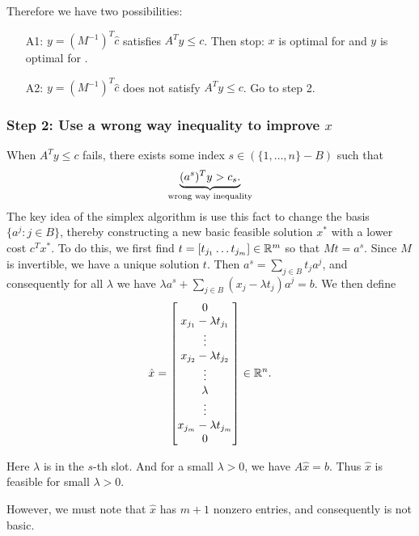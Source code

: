 Therefore we have two possibilities:
\begin{enumerate}
    \item[A1:] $y = (M^{-1})^T \hat{c}$ satisfies $A^T y \le c$.
    Then stop: $x$ is optimal for  and $y$ is optimal for .
    \item[A2:] $y = (M^{-1})^T \hat{c}$ does not satisfy $A^T y \le c$.
    Go to step 2.
\end{enumerate}

\subsubsection{Step 2: Use a wrong way inequality to improve $x$}

When $A^T y \le c$ fails, there exists some index $s \in (\{ 1, \dots, n \} - B)$ such that 
\begin{align}
\underbrace{(a^s)^T y > c_s.}_{\text{wrong way inequality}} \labeq{LP_wrong_way}
\end{align}
The key idea of the simplex algorithm is use this fact to change the basis $\{a^j : j \in B \}$, thereby constructing a new basic feasible solution $x^*$ with a lower cost $c^T x^*$.
To do this, we first find $t = [t_{j_1} \dots t_{j_m}] \in \mathbb{R}^m$ so that $Mt = a^s$.
Since $M$ is invertible, we have a unique solution $t$.
Then $a^s = \sum _{j \in B} t_j a^j$, and consequently for all $\lambda$ we have $\lambda a^s + \sum _{j \in B} (x_j - \lambda t_j) a^j = b$.
We then define
\begin{align}
\hat{x} = \begin{bmatrix}
0 \\
x_{j_1} - \lambda t_{j_1} \\
\vdots \\
x_{j_2} - \lambda t_{j_2} \\
\vdots \\
\lambda \\
\vdots \\
x_{j_m} - \lambda t_{j_m} \\
0 \\
\end{bmatrix}
\in \mathbb{R}^n.
\end{align}

Here $\lambda$ is in the $s$-th slot.
And for a small $\lambda > 0$, we have $A\hat{x} = b$.
Thus $\hat{x}$ is feasible for  small $\lambda > 0$.

However, we must note that $\hat{x}$ has $m+1$ nonzero entries, and consequently is not basic.

